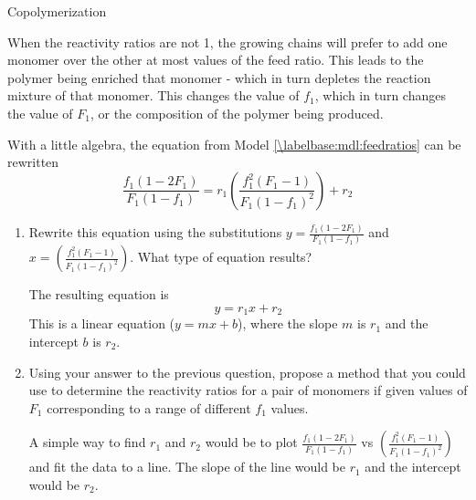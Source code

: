\begin{activity}{Copolymerization}
\begin{ctqs}
\begin{enumerate}
				\begin{solution}[1in]{}
					When the reactivity ratios are not 1, the growing chains will prefer to add one monomer over the other at most values of the feed ratio.  This leads to the polymer being enriched that monomer - which in turn depletes the reaction mixture of that monomer.  This changes the value of $f_1$, which in turn changes the value of $F_1$, or the composition of the polymer being produced.
				\end{solution}
			
		\end{enumerate}
		
	\question \label{\labelbase:ctq:FinemanRoss} With a little algebra, the equation from Model \ref{\labelbase:mdl:feedratios} can be rewritten
		\begin{equation*}
			\frac{f_1(1-2F_1)}{F_1(1-f_1)} = r_1\left(\frac{f_1^2(F_1-1)}{F_1(1-f_1)^2}\right)+r_2
		\end{equation*}
		
		\begin{enumerate}
			\item Rewrite this equation using the substitutions $y=\frac{f_1(1-2F_1)}{F_1(1-f_1)}$ and $x=\left(\frac{f_1^2(F_1-1)}{F_1(1-f_1)^2}\right)$.  What type of equation results?
			
				\begin{solution}[1in]{}
					The resulting equation is
					\begin{equation*}
						y = r_1 x + r_2
					\end{equation*}
					This is a linear equation ($y=mx+b$), where the slope $m$ is $r_1$ and the intercept $b$ is $r_2$.
				\end{solution}
			
			\item Using your answer to the previous question, propose a method that you could use to determine the reactivity ratios for a pair of monomers if given values of $F_1$ corresponding to a range of different $f_1$ values.
			
				\begin{solution}[1in]{}
					A simple way to find $r_1$ and $r_2$ would be to plot $\frac{f_1(1-2F_1)}{F_1(1-f_1)}$ vs  $\left(\frac{f_1^2(F_1-1)}{F_1(1-f_1)^2}\right)$ and fit the data to a line.  The slope of the line would be $r_1$ and the intercept would be $r_2$.
				\end{solution}
		\end{enumerate}
\end{ctqs}



\end{activity}
